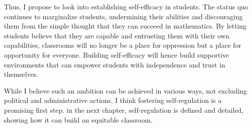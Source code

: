 Thus, I propose to look into establishing self-efficacy in students. The status quo continues to marginalize students, undermining their abilities and discouraging them from the simple thought that they can succeed in mathematics. By letting students believe that they are capable and entrusting them with their own capabilities, classrooms will no longer be a place for oppression but a place for opportunity for everyone. Building self-efficacy will hence build supportive environments that can empower students with independence and trust in themselves.

While I believe such an ambition can be achieved in various ways, not excluding political and administrative actions, I think fostering self-regulation is a promising first step. in the next chapter, self-regulation is defined and detailed, showing how it can build an equitable classroom.
